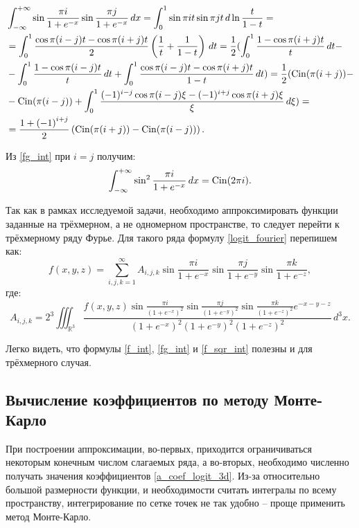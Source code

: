 \begin{align}
	&\int_{-\infty}^{+\infty}\sin{\frac{\pi i}{1+e^{-x}}}\sin{\frac{\pi j}{1+e^{-x}}} \, dx = \int_0^1\sin{\pi it}\sin{\pi jt} \, d\ln{\frac{t}{1-t}} = \notag \\
	&= \int_0^1\frac{\cos\pi (i-j)t - \cos\pi (i+j)t}{2}\left(\frac{1}{t} + \frac{1}{1-t}\right)\, dt = \frac{1}{2}(\int_0^1\frac{1-\cos\pi (i+j)t}{t}\, dt - \notag \\
	&- \int_0^1\frac{1-\cos\pi (i-j)t}{t}\, dt + \int_0^1\frac{\cos\pi (i-j)t-\cos\pi (i+j)t}{1-t}\, dt) = \frac{1}{2}(\operatorname{Cin}(\pi(i+j)) -\notag \\
	&- \operatorname{Cin}(\pi(i-j)) + \int_0^1\frac{{(-1)^{i-j}}\cos\pi(i-j)\xi - {(-1)^{i+j}}\cos\pi(i+j)\xi}{\xi}\, d\xi) = \notag \\
	&= \frac{1+{(-1)}^{i+j}}{2}\left(\operatorname{Cin}(\pi(i+j)) - \operatorname{Cin}(\pi(i-j))\right).
	\label{fg_int}
\end{align}

Из \ref{fg_int} при $i=j$ получим:
\begin{equation}
	\int_{-\infty}^{+\infty}\sin^2\frac{\pi i}{1+e^{-x}}\, dx = \operatorname{Cin}(2\pi i).
	\label{f_sqr_int}
\end{equation}

Так как в рамках исследуемой задачи, необходимо аппроксимировать функции заданные на трёхмерном, а не одномерном пространстве, то следует перейти к трёхмерному ряду Фурье.
Для такого ряда формулу \ref{logit_fourier} перепишем как:
\begin{equation}
	f(x,y,z) = \sum_{i,j,k=1}^\infty A_{i,j,k}\sin{\frac{\pi i}{1 + e^{-x}}}\sin{\frac{\pi j}{1 + e^{-y}}}\sin{\frac{\pi k}{1 + e^{-z}}},
	\label{logit_fourier_3d}
\end{equation}
где:
\begin{equation}
	A_{i,j,k} = 2^3\iiint_{\mathbb{R}^3}\frac{f(x, y, z)\sin\frac{\pi i}{(1+e^{-x})^2}\sin\frac{\pi j}{(1+e^{-y})^2}\sin\frac{\pi k}{(1+e^{-z})^2}e^{-x-y-z}}{(1+e^{-x})^2(1+e^{-y})^2(1+e^{-z})^2}\, d^3x.
	\label{a_coef_logit_3d}
\end{equation}

Легко видеть, что формулы \ref{f_int}, \ref{fg_int} и \ref{f_sqr_int} полезны и для трёхмерного случая.

\subsection{Вычисление коэффициентов по методу Монте-Карло}

При построении аппроксимации, во-первых, приходится ограничиваться некоторым конечным числом слагаемых ряда, а во-вторых, необходимо численно получать значения коэффициентов \ref{a_coef_logit_3d}. Из-за относительно большой размерности функции, и необходимости считать интегралы по всему пространству, интегрирование по сетке точек не так удобно -- проще применить метод Монте-Карло.

